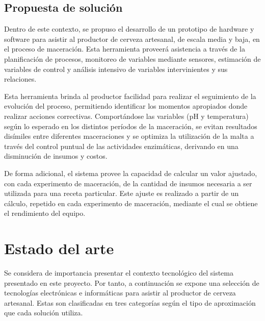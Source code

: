     
    
    
    
    
	
	
	\subsection{ Propuesta de solución }
	\par
    Dentro de este contexto, se propuso el desarrollo de un prototipo de hardware y software para asistir al productor de cerveza artesanal, de escala media y baja, en el proceso de maceración. Esta herramienta proveerá asistencia a través de la planificación de procesos, monitoreo de variables mediante sensores, estimación de variables de control y análisis intensivo de variables intervinientes y sus relaciones.
    \par
    Esta herramienta brinda al productor facilidad para realizar el seguimiento de la evolución del proceso, permitiendo identificar los momentos apropiados donde realizar acciones correctivas. Comportándose las variables (pH y temperatura) según lo esperado en los distintos períodos de la maceración, se evitan resultados disímiles entre diferentes maceraciones y se optimiza la utilización de la malta a través del control puntual de las actividades enzimáticas, derivando en una disminución de insumos y costos.
    \par
    De forma adicional, el sistema provee la capacidad de calcular un valor ajustado, con cada experimento de maceración, de la cantidad de insumos necesaria a ser utilizada para una receta particular. Este ajuste es realizado a partir de un cálculo, repetido en cada experimento de maceración, mediante el cual se obtiene el rendimiento del equipo.
    
\section{Estado del arte}
\label{seccionEstadoDelArte}
    \par
    Se considera de importancia presentar el contexto tecnológico del sistema presentado en este proyecto. Por tanto, a continuación se expone una selección de tecnologías electrónicas e informáticas para asistir al productor de cerveza artesanal. Estas son clasificadas en tres categorías según el tipo de aproximación que cada solución utiliza.
    
